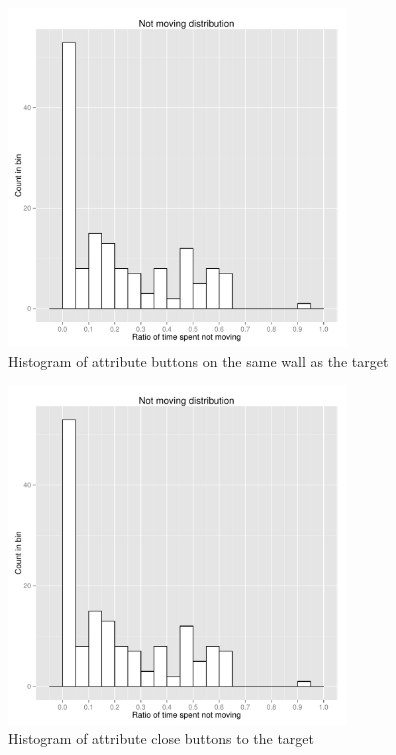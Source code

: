 \begin{figure}[!htbp]
  \centering
	\includegraphics[page=7,width=0.8\textwidth]{Images/chains_features_ML}
	\caption{Histogram of attribute buttons on the same wall as the target}
	\label{fig:chains-distrib-samewall}
\end{figure}

\begin{figure}[!htbp]
  \centering
	\includegraphics[page=8,width=0.8\textwidth]{Images/chains_features_ML}
	\caption{Histogram of attribute close buttons to the target}
	\label{fig:chains-distrib-close}
\end{figure}

